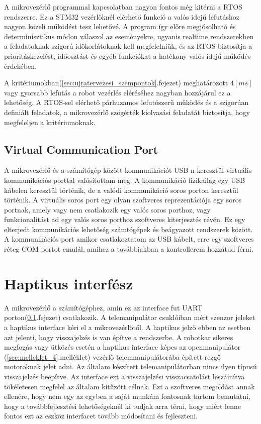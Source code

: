 A mikrovezérlő programmal kapcsolatban nagyon fontos még kitérni a RTOS rendszerre. Ez a STM32 vezérlőknél elérhető funkció a valós idejű lefutáshoz nagyon közeli működést tesz lehetővé. A program így előre megjósolható és determinisztikus módon válaszol az eseményekre, ugyanis realtime rendszerekben a feladatoknak szigorú időkorlátoknak kell megfelelniük, és az RTOS biztosítja a prioritáskezelést, időosztást és egyéb funkciókat a hatékony valós idejű működés érdekében.

A kritériumokban(\ref{sec:ujratervezesi_szempontok}.fejezet) meghatározott $4[ms]$ vagy gyorsabb lefutás a robot vezérlés eléréséhez nagyban hozzájárul ez a lehetőség. A RTOS-sel elérhető párhuzamos lefutószerű működés és a szigorúan definiált feladatok, a mikrovezérlő szögérték kiolvasási feladatát biztosítja, hogy megfeleljen a kritériumoknak.

\subsection{Virtual Communication Port}
\label{sec:vcp_port}

A mikrovezérlő és a számítógép között kommunikációt USB-n keresztül virtuális kommunikációs porttal valósítottam meg. A kommunikáció fizikailag egy USB kábelen keresztül történik, de a valódi kommunikáció soros porton keresztül történik. A virtuális soros port egy olyan szoftveres reprezentációja egy soros portnak, amely vagy nem csatlakozik egy valós soros porthoz, vagy funkcionalitást ad egy valós soros porthoz szoftveres kiterjesztés révén. Ez egy elterjedt kommunikációs lehetőség számtógépek és beágyazott rendszerek között. A kommunikációs port amikor csatlakoztatom az USB kábelt, erre egy szoftveres réteg COM portot emulál, amihez a továbbiakban a kontrollerem hozzátud férni.\citep{ekekwe2008wide}

\section{Haptikus interfész}

A mikrovezérlő a számítógéphez, amin ez az interface fut UART porton(\ref{sec:vcp_port}.fejezet) csatlakozik. A telemanipulátor csuklóiban mért szenzor jeleket a haptikus interface kéri el a mikrovezérlőtől. A haptikus jelző ebben az esetben azt jelenti, hogy visszajelzés is van építve a rendszerbe. A robotkar sikeres megfogás vagy ütközés esetén a haptikus interface képes az openmanipulátor (\ref{sec:melleklet_4}.melléklet) vezérlő telemnanipulátorába épített rezgő motoroknak jelet adni. Az általam készített telemanipulátorban nincs ilyen típusú visszajelzés beépítve. Az interface ezt a visszajelzési visszacsatolást leszámítva tökéletesen megfelel az általam kitűzött célnak. Ezt a szoftveres megoldást annak ellenére, hogy nem egy az egyben a saját munkám fontosnak tartom bemutatni, hogy a továbbfejlesztési lehetőségeknél ki tudjak arra térni, hogy miért lenne fontos ezt az eszköz interfacet tovább módosítani és fejleszteni.\cite{MogiHapticDevice}\cite{ROSnoetic}

